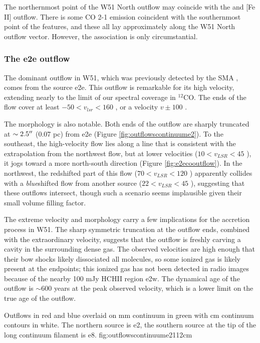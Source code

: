 \documentclass{emulateapj}
\begin{document}
The northernmost point of the W51 North outflow may coincide with
the \citet{Hodapp2002a} \hh and [Fe II] outflow.  There is some CO 2-1
emission coincident with the southernmost point of the \hh features,
and these all lay approximately along the W51 North outflow vector.
However, the association is only circumstantial.


\subsubsection{The e2e outflow}
The dominant outflow in W51, which was previously detected by the SMA
\citep{Shi2010a,Shi2010b}, comes from the source e2e.  This outflow is
remarkable for its high velocity, extending nearly to the limit of our spectral
coverage in $^{12}$CO.  The ends of the flow cover at least $-50 < v_{lsr} <
160$ \kms, or a velocity $v\pm100$ \kms.  

The morphology is also notable.  Both ends of the outflow are sharply truncated
at $\sim2.5\mbox{$^{\prime\prime}$}$ (0.07 pc) from e2e (Figure \ref{fig:outflowscontinuume2}).
To the southeast, the high-velocity flow lies along a line that is consistent
with the extrapolation from the northwest flow, but at lower velocities ($10 <
v_{LSR} < 45$ \kms), it jogs toward a more north-south direction (Figure
\ref{fig:e2ecooutflow}).  In the
northwest, the redshifted part of this flow ($70 < v_{LSR} < 120$ \kms)
apparently collides with a \emph{blue}shifted flow from another source ($22 <
v_{LSR} < 45$ \kms), suggesting that these outflows intersect, though such a
scenario seems  implausible given their small volume filling factor.

The extreme velocity and morphology carry a few implications for the
accretion process in W51.  The sharp symmetric truncation at the outflow ends,
combined with the extraordinary velocity, suggests that the outflow is freshly
carving a cavity in the surrounding dense gas.  The observed velocities are
high enough that their bow shocks likely dissociated all molecules, so some
ionized gas is likely present at the endpoints; this ionized gas has not been
detected in radio images because of the nearby 100 mJy HCHII region e2w.  The
dynamical age of the outflow is $\sim600$ years at the peak observed velocity,
which is a lower limit on the true age of the outflow.


{Outflows in red and blue overlaid on mm continuum in green with cm continuum
contours in white.  The northern source is e2, the southern source at the tip
of the long continuum filament is e8.}
{fig:outflowscontinuume2}{1}{12cm}
\end{document}
